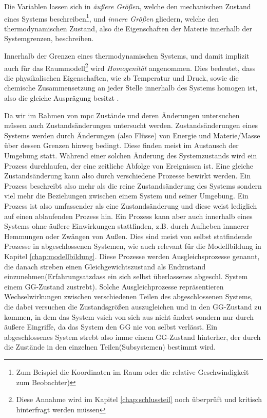 Die Variablen lassen sich in \textit{äußere Größen}, welche den mechanischen Zustand eines Systems beschreiben\footnote{Zum Beispiel die Koordinaten im Raum oder die relative Geschwindigkeit zum Beobachter)}, und \textit{innere Größen} gliedern, welche den thermodynamischen Zustand, also die Eigenschaften der Materie innerhalb der Systemgrenzen, beschreiben\cite[S.13~f.]{ba12}.

Innerhalb der Grenzen eines thermodynamischen Systems, und damit implizit auch für das Raummodell\footnote{Diese Annahme wird im Kapitel \ref{chap:schlussteil} noch überprüft und kritisch hinterfragt werden müssen} wird \textit{Homogenität} angenommen. Dies bedeutet, dass die physikalischen Eigenschaften, wie \acrlong{zb} Temperatur und Druck, sowie die chemische Zusammensetzung an jeder Stelle innerhalb des Systems homogen ist, also die gleiche Ausprägung besitzt \cite[S.15]{ba12}.

Da wir im Rahmen von \acrlong{mpc} Zustände und deren Änderungen untersuchen müssen auch Zustandsänderungen untersucht werden. Zustandsänderungen eines Systems werden durch Änderungen (also Flüsse) von Energie und Materie/Masse über dessen Grenzen hinweg bedingt. Diese finden meist im Austausch der Umgebung statt. Während einer solchen Änderung des Systemzustands wird ein Prozess durchlaufen, der eine zeitliche Abfolge von Ereignissen ist. Eine gleiche Zustandsänderung kann also durch verschiedene Prozesse bewirkt werden. Ein Prozess beschreibt also mehr als die reine Zustandsänderung des Systems sondern viel mehr die Beziehungen zwischen einem System und seiner Umgebung. 
Ein Prozess ist also umfassender als eine Zustandsänderung und diese weist lediglich auf einen ablaufenden Prozess hin.
Ein Prozess kann aber auch innerhalb eines Systems ohne äußere Einwirkungen stattfinden, z.B. durch Aufheben innnerer Hemmungen oder Zwängen von Außen. Dies sind meist von selbst statfindende Prozesse in abgeschlossenen Systemen, wie auch relevant für die Modellbildung in Kapitel \ref{chap:modellbildung}. Diese Prozesse werden Ausgleichsprozesse genannt, die danach streben einen Gleichgewichtszustand als Endzustand einzunehmen(\Gun Erfahrungsatz\Gob dass ein sich selbst überlassenes abgeschl. System einem GG-Zustand zustrebt). Solche Ausgleichprozesse repräsentieren Wechselwirkungen zwischen verschiedenen Teilen des abgeschlossenen Systems, die dabei versuchen die Zustandsgrößen auszugleichen und in den GG-Zustand zu kommen, in dem das System vsich von sich aus nicht ändert sondern nur durch äußere Eingriffe, da das System den GG nie von selbst verlässt. Ein abgeschlossenes System strebt also imme einem GG-Zustand hinterher, der durch die Zustände in den einzelnen Teilen(Subsystemen) bestimmt wird. 
\cite[S.21~f.]{ba12}


